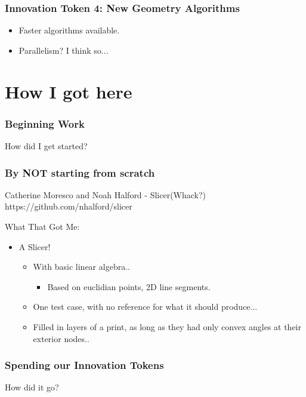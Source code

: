 \documentclass[hyperref={pdfpagemode=FullScreen},aspectratio=169]{beamer}
\begin{document}
\begin{frame}
  \frametitle{Innovation Token 4: New Geometry Algorithms}
  \begin{itemize}
  \item Faster algorithms available.
  \item Parallelism? I think so...
  \end{itemize}
\end{frame}

\section{How I got here}

\begin{frame}
  \frametitle{Beginning Work}
  \Huge{\centerline{How did I get started?}}
\end{frame}

\begin{frame}
  \frametitle{By NOT starting from scratch}
  \begin{block}{Catherine Moresco and Noah Halford - Slicer(Whack?)}
    https://github.com/nhalford/slicer
  \end{block}
  What That Got Me:
  \begin{itemize}
  \item A Slicer!
    \begin{itemize}
    \item With basic linear algebra..
      \begin{itemize}
      \item Based on euclidian points, 2D line segments.
      \end{itemize}
    \item One test case, with no reference for what it should produce...
    \item Filled in layers of a print, as long as they had only convex angles at their exterior nodes..
    \end{itemize}
  \end{itemize}
\end{frame}

\begin{frame}
  \frametitle{Spending our Innovation Tokens}
  \Huge{\centerline{How did it go?}}
\end{frame}
\end{document}

